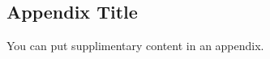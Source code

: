 \documentclass[oneside, astronomy, noacknowlegments]{BYUPhys}
\begin{document}
\begin{appendices}

\chapter{Appendix Title}
\label{sec:appendixname}

You can put supplimentary content in an appendix.

\end{appendices}

 

 \printindex
\end{document}
